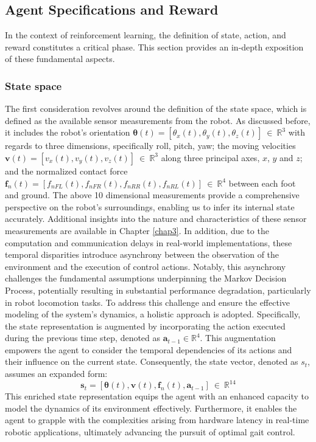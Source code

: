 \subsection{Agent Specifications and Reward}
In the context of reinforcement learning, the definition of state, action, and reward constitutes a critical phase. This section provides an in-depth exposition of these fundamental aspects.
\subsubsection{State space}
\label{sec:ss}
The first consideration revolves around the definition of the state space, which is defined as the available sensor measurements from the robot. As discussed before, it includes the robot's orientation $\pmb{\theta}(t) =[\theta_x(t),\theta_y(t),\theta_z(t)]\:\in\:\mathbb{R}^3$ with regards to three dimensions, specifically roll, pitch, yaw; the moving velocities $\mathbf{v}(t) =[v_x(t),v_y(t),v_z(t)]\:\in\:\mathbb{R}^3$ along three principal axes, $x$, $y$ and $z$; and the normalized contact force $\mathbf{f}_n(t)=[f_{nFL}(t), f_{nFR}(t), f_{nRR}(t), f_{nRL}(t)]\:\in\:\mathbb{R}^4$ between each foot and ground. The above 10 dimensional measurements provide a comprehensive perspective on the robot's surroundings, enabling us to infer its internal state accurately. Additional insights into the nature and characteristics of these sensor measurements are available in Chapter \ref{chap3}. In addition, due to the computation and communication delays in real-world implementations, these temporal disparities introduce asynchrony between the observation of the environment and the execution of control actions. Notably, this asynchrony challenges the fundamental assumptions underpinning the Markov Decision Process, potentially resulting in substantial performance degradation, particularly in robot locomotion tasks. To address this challenge and ensure the effective modeling of the system's dynamics, a holistic approach is adopted. Specifically, the state representation is augmented by incorporating the action executed during the previous time step, denoted as $\mathbf{a}_{t-1} \in \mathbb{R}^4$. This augmentation empowers the agent to consider the temporal dependencies of its actions and their influence on the current state. Consequently, the state vector, denoted as $s_t$, assumes an expanded form: $$\mathbf{s}_t =[\mathbf{\theta}(t),\mathbf{v}(t),\mathbf{f}_n(t),\mathbf{a}_{t-1}] \:\in\:\mathbb{R}^{14}$$ This enriched state representation equips the agent with an enhanced capacity to model the dynamics of its environment effectively. Furthermore, it enables the agent to grapple with the complexities arising from hardware latency in real-time robotic applications, ultimately advancing the pursuit of optimal gait control.
